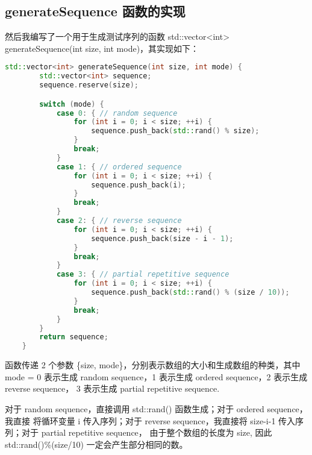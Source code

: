 \documentclass[UTF8]{ctexart}
\begin{document}
\subsection{generateSequence 函数的实现}
然后我编写了一个用于生成测试序列的函数 std::vector<int> generateSequence(int size, int mode)，其实现如下：
\begin{lstlisting}[language=c++, breaklines=true, keywordstyle=\color{blue!70}, commentstyle=\color{red!50!green!50!blue!50}, frame=shadowbox, rulesepcolor=\color{red!20!green!20!blue!20}]
    std::vector<int> generateSequence(int size, int mode) {
        std::vector<int> sequence;
        sequence.reserve(size);

        switch (mode) {
            case 0: { // random sequence
                for (int i = 0; i < size; ++i) {
                    sequence.push_back(std::rand() % size);
                }
                break;
            }
            case 1: { // ordered sequence
                for (int i = 0; i < size; ++i) {
                    sequence.push_back(i);
                }
                break;
            }
            case 2: { // reverse sequence
                for (int i = 0; i < size; ++i) {
                    sequence.push_back(size - i - 1);
                }
                break;
            }
            case 3: { // partial repetitive sequence
                for (int i = 0; i < size; ++i) {
                    sequence.push_back(std::rand() % (size / 10));
                }
                break;
            }
        }
        return sequence;
    }
\end{lstlisting}

函数传递 2 个参数 \{size, mode\}，分别表示数组的大小和生成数组的种类，其中 mode = 0 
表示生成 random sequence，1 表示生成 ordered sequence，2 表示生成 reverse sequence，
3 表示生成 partial repetitive sequence. 

对于 random sequence，直接调用 std::rand() 函数生成；对于 ordered sequence，我直接
将循环变量 i 传入序列；对于 reverse sequence，我直接将 size-i-1 传入序列；对于 partial repetitive sequence，
由于整个数组的长度为 size, 因此 std::rand()\%(size/10) 一定会产生部分相同的数。
\end{document}
